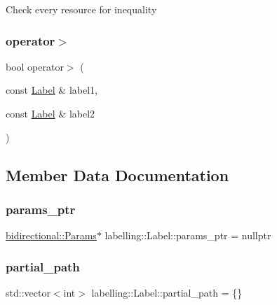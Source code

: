 Check every resource for inequality \mbox{\label{classlabelling_1_1Label_a7bd46e6920cac7ede4b725f2d33fb12b}} 
\subsubsection{\texorpdfstring{operator$>$}{operator>}}
{\footnotesize\ttfamily bool operator$>$ (\begin{DoxyParamCaption}\item[{const \hyperlink{classlabelling_1_1Label}{Label} \&}]{label1,  }\item[{const \hyperlink{classlabelling_1_1Label}{Label} \&}]{label2 }\end{DoxyParamCaption})\hspace{0.3cm}{\ttfamily [friend]}}



\subsection{Member Data Documentation}
\mbox{\label{classlabelling_1_1Label_a182759fd08c2536f9e6a2614c790b127}} 
\subsubsection{\texorpdfstring{params\+\_\+ptr}{params\_ptr}}
{\footnotesize\ttfamily \hyperlink{classbidirectional_1_1Params}{bidirectional\+::\+Params}$\ast$ labelling\+::\+Label\+::params\+\_\+ptr = nullptr}

\mbox{\label{classlabelling_1_1Label_a7511d29a3aa0272b1a0e1ea5fb75ff14}} 
\subsubsection{\texorpdfstring{partial\+\_\+path}{partial\_path}}
{\footnotesize\ttfamily std\+::vector$<$int$>$ labelling\+::\+Label\+::partial\+\_\+path = \{\}}

